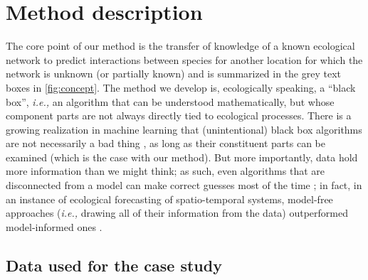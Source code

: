\section{Method description}\label{method-description}

The core point of our method is the transfer of knowledge of a known
ecological network to predict interactions between species for another
location for which the network is unknown (or partially known) and is
summarized in the grey text boxes in \autoref{fig:concept}. The method we develop
is, ecologically speaking, a ``black box'', \emph{i.e.,} an algorithm
that can be understood mathematically, but whose component parts are not
always directly tied to ecological processes. There is a growing
realization in machine learning that (unintentional) black box
algorithms are not necessarily a bad thing \cite{Holm2019DefBla}, as
long as their constituent parts can be examined (which is the case with
our method). But more importantly, data hold more information than we
might think; as such, even algorithms that are disconnected from a model
can make correct guesses most of the time \cite{Halevy2009UnrEff}; in
fact, in an instance of ecological forecasting of spatio-temporal
systems, model-free approaches (\emph{i.e.,} drawing all of their
information from the data) outperformed model-informed ones
\cite{Perretti2013ModFor}.

\subsection{Data used for the case
study}\label{data-used-for-the-case-study}

